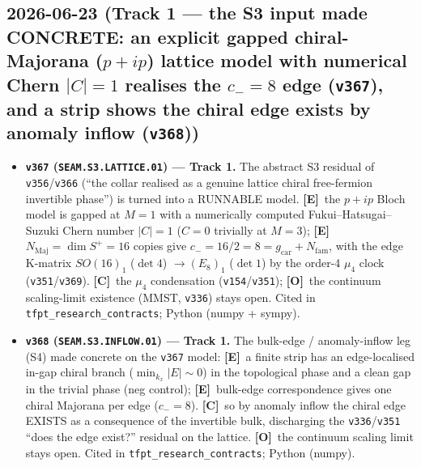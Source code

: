 \documentclass[11pt]{article}
\providecommand{\mE}{\textbf{[E]}}\providecommand{\mC}{\textbf{[C]}}
\providecommand{\mO}{\textbf{[O]}}\providecommand{\mX}{\textbf{[X]}}
\providecommand{\vref}[1]{\texttt{#1}}
\providecommand{\gcar}{g_{\mathrm{car}}}\providecommand{\Nfam}{N_{\mathrm{fam}}}
\begin{document}
\subsection*{2026-06-23 (Track 1 --- the S3 input made CONCRETE: an explicit gapped chiral-Majorana ($p{+}ip$) lattice model with numerical Chern $|C|{=}1$ realises the $c_-{=}8$ edge (\texttt{v367}), and a strip shows the chiral edge exists by anomaly inflow (\texttt{v368}))}
\begin{itemize}
\item \textbf{\texttt{v367} (\texttt{SEAM.S3.LATTICE.01}) --- Track 1.} The abstract S3 residual of
\vref{v356}/\vref{v366} (``the collar realised as a genuine lattice chiral free-fermion invertible phase'')
is turned into a RUNNABLE model. \mE\ the $p{+}ip$ Bloch model is gapped at $M{=}1$ with a numerically
computed Fukui--Hatsugai--Suzuki Chern number $|C|{=}1$ ($C{=}0$ trivially at $M{=}3$); \mE\
$N_{\mathrm{Maj}}{=}\dim S^+{=}16$ copies give $c_-{=}16/2{=}8{=}\gcar{+}\Nfam$, with the edge K-matrix
$SO(16)_1$ ($\det 4$) $\to(E_8)_1$ ($\det 1$) by the order-4 $\mu_4$ clock (\vref{v351}/\vref{v369}). \mC\ the
$\mu_4$ condensation (\vref{v154}/\vref{v351}); \mO\ the continuum scaling-limit existence (MMST, \vref{v336})
stays open. Cited in \texttt{tfpt\_research\_contracts}; Python (numpy + sympy).
\item \textbf{\texttt{v368} (\texttt{SEAM.S3.INFLOW.01}) --- Track 1.} The bulk-edge / anomaly-inflow leg (S4)
made concrete on the \vref{v367} model: \mE\ a finite strip has an edge-localised in-gap chiral branch
($\min_{k_x}|E|\sim0$) in the topological phase and a clean gap in the trivial phase (neg control); \mE\
bulk-edge correspondence gives one chiral Majorana per edge ($c_-{=}8$). \mC\ so by anomaly inflow the chiral
edge EXISTS as a consequence of the invertible bulk, discharging the \vref{v336}/\vref{v351} ``does the edge
exist?'' residual on the lattice. \mO\ the continuum scaling limit stays open. Cited in
\texttt{tfpt\_research\_contracts}; Python (numpy).
\end{itemize}
\end{document}
